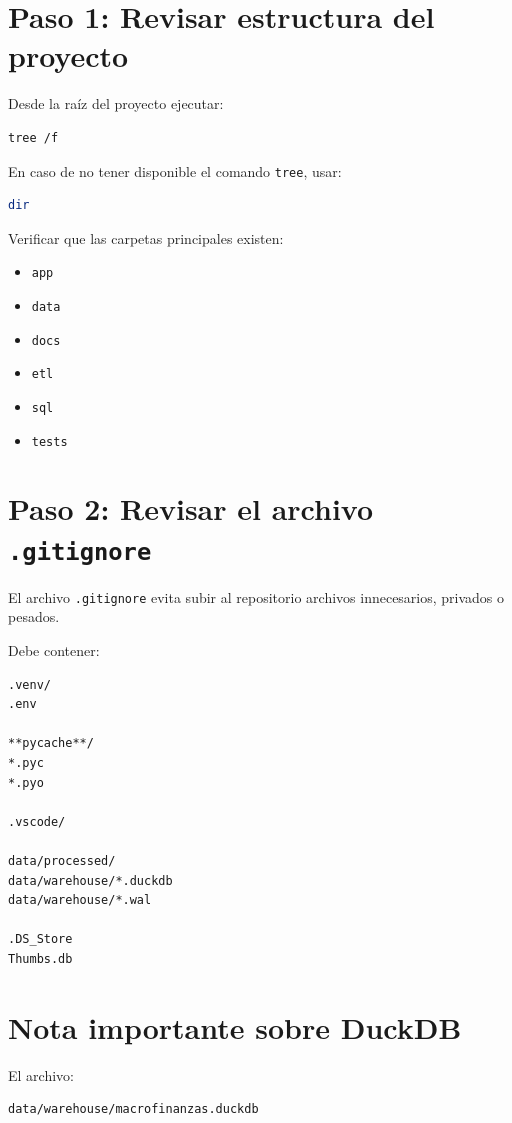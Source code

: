 \section{Paso 1: Revisar estructura del proyecto}

Desde la raíz del proyecto ejecutar:

\begin{lstlisting}[language=bash]
tree /f
\end{lstlisting}

En caso de no tener disponible el comando \texttt{tree}, usar:

\begin{lstlisting}[language=bash]
dir
\end{lstlisting}

Verificar que las carpetas principales existen:

\begin{itemize}
\item \texttt{app}
\item \texttt{data}
\item \texttt{docs}
\item \texttt{etl}
\item \texttt{sql}
\item \texttt{tests}
\end{itemize}

\section{Paso 2: Revisar el archivo \texttt{.gitignore}}

El archivo \texttt{.gitignore} evita subir al repositorio archivos innecesarios, privados o pesados.

Debe contener:

\begin{lstlisting}
.venv/
.env

**pycache**/
*.pyc
*.pyo

.vscode/

data/processed/
data/warehouse/*.duckdb
data/warehouse/*.wal

.DS_Store
Thumbs.db
\end{lstlisting}

\section{Nota importante sobre DuckDB}

El archivo:

\begin{verbatim}
data/warehouse/macrofinanzas.duckdb
\end{verbatim}

